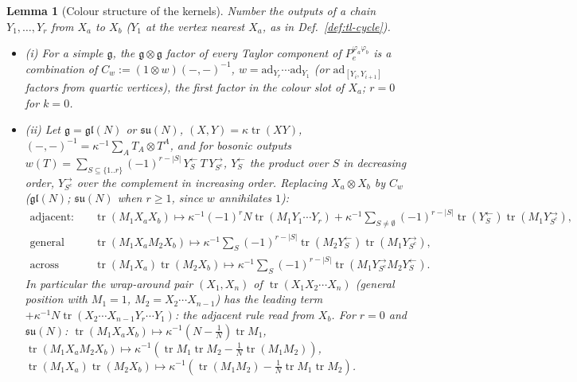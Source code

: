 \documentclass[11pt]{article}
\numberwithin{equation}{section}
\theoremstyle{plain}
\newtheorem{lemma}[theorem]{Lemma}
\theoremstyle{definition}
\begin{document}
\begin{lemma}[Colour structure of the kernels]
\label{lem:tl-colour}
Number the outputs of a chain $Y_1,\dots,Y_r$ from $X_a$ to $X_b$ ($Y_1$ at the vertex nearest $X_a$, as in Def.~\ref{def:tl-cycle}).
\begin{itemize}
\item (i) For a simple $\mathfrak g$, the $\mathfrak g\otimes\mathfrak g$ factor of every Taylor component of $P_e^{\varphi_a\varphi_b}$ is a combination of $C_w:=(1\otimes w)(-,-)^{-1}$, $w=\mathrm{ad}_{Y_r}\cdots\mathrm{ad}_{Y_1}$ (or $\mathrm{ad}_{[Y_i,Y_{i+1}]}$ factors from quartic vertices), the first factor in the colour slot of $X_a$; $r=0$ for $k=0$.
\item (ii) Let $\mathfrak g=\mathfrak{gl}(N)$ or $\mathfrak{su}(N)$, $(X,Y)=\kappa\operatorname{tr}(XY)$, $(-,-)^{-1}=\kappa^{-1}\sum_AT_A\otimes T^A$, and for bosonic outputs $w(T)=\sum_{S\subseteq\{1..r\}}(-1)^{r-|S|}\,Y_S^{\leftarrow}\,T\,Y_{S^c}^{\to}$, $Y^{\leftarrow}_S$ the product over $S$ in decreasing order, $Y^\to_{S^c}$ over the complement in increasing order. Replacing $X_a\otimes X_b$ by $C_w$ ($\mathfrak{gl}(N)$; $\mathfrak{su}(N)$ when $r\ge1$, since $w$ annihilates $1$):
\[
\begin{aligned}
\text{adjacent:}\quad&\operatorname{tr}(M_1X_aX_b)\mapsto\kappa^{-1}(-1)^rN\operatorname{tr}(M_1Y_1\cdots Y_r)+\kappa^{-1}\sum_{S\ne\emptyset}(-1)^{r-|S|}\operatorname{tr}(Y_S^{\leftarrow})\operatorname{tr}(M_1Y_{S^c}^{\to}),\\
\text{general position:}\quad&\operatorname{tr}(M_1X_aM_2X_b)\mapsto\kappa^{-1}\sum_S(-1)^{r-|S|}\operatorname{tr}(M_2Y_S^{\leftarrow})\operatorname{tr}(M_1Y_{S^c}^{\to}),\\
\text{across traces:}\quad&\operatorname{tr}(M_1X_a)\operatorname{tr}(M_2X_b)\mapsto\kappa^{-1}\sum_S(-1)^{r-|S|}\operatorname{tr}(M_1Y_{S^c}^{\to}M_2Y_S^{\leftarrow}).
\end{aligned}
\]
In particular the wrap-around pair $(X_1,X_n)$ of $\operatorname{tr}(X_1X_2\cdots X_n)$ (general position with $M_1=1$, $M_2=X_2\cdots X_{n-1}$) has the leading term $+\kappa^{-1}N\operatorname{tr}(X_2\cdots X_{n-1}Y_r\cdots Y_1)$: the adjacent rule read from $X_b$. For $r=0$ and $\mathfrak{su}(N)$: $\operatorname{tr}(M_1X_aX_b)\mapsto\kappa^{-1}(N-\tfrac1N)\operatorname{tr}M_1$, $\operatorname{tr}(M_1X_aM_2X_b)\mapsto\kappa^{-1}(\operatorname{tr}M_1\operatorname{tr}M_2-\tfrac1N\operatorname{tr}(M_1M_2))$, $\operatorname{tr}(M_1X_a)\operatorname{tr}(M_2X_b)\mapsto\kappa^{-1}(\operatorname{tr}(M_1M_2)-\tfrac1N\operatorname{tr}M_1\operatorname{tr}M_2)$.

\end{itemize}
\end{lemma}
\end{document}
